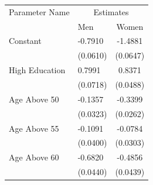 \begin{tabular}{llc}
    \toprule
     Parameter Name  & \multicolumn{2}{c}{Estimates} \\
     {}              & {Men} &{Women}   \\
    \midrule
    Constant & -0.7910 & -1.4881 \\
    {} & (0.0610) & (0.0647) \\
    High Education & 0.7991 & 0.8371 \\
    {} & (0.0718) & (0.0488) \\
    Age Above 50 & -0.1357 & -0.3399 \\
    {} & (0.0323) & (0.0262) \\
    Age Above 55 & -0.1091 & -0.0784 \\
    {} & (0.0400) & (0.0303) \\
    Age Above 60 & -0.6820 & -0.4856 \\
    {} & (0.0440) & (0.0439) \\
    \bottomrule
\end{tabular}
